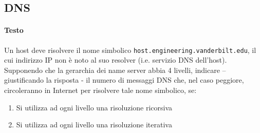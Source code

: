 \documentclass[10pt]{article}
\begin{document}
\subsection{DNS}
\paragraph{Testo} Un host deve risolvere il nome simbolico \texttt{host.engineering.vanderbilt.edu}, il cui indirizzo IP non è noto al suo resolver (i.e. servizio DNS dell’host).\\
Supponendo che la gerarchia dei name server abbia 4 livelli, indicare – giustificando la risposta - il numero di messaggi DNS che, nel caso peggiore, circoleranno in Internet per risolvere tale nome
simbolico, se:
\begin{enumerate}
\item Si utilizza ad ogni livello una risoluzione ricorsiva
\item Si utilizza ad ogni livello una risoluzione iterativa
\end{enumerate}
\end{document}
